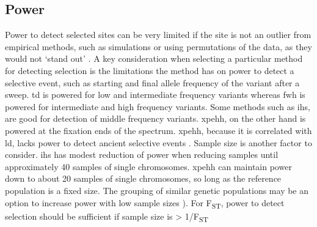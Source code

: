 \documentclass[]{report}
\begin{document}
\subsection{Power}\label{power}

Power to detect selected sites can be very limited if the site is not an
outlier from empirical methods, such as simulations or using
permutations of the data, as they would not `stand out'
\citep{Teshima2006}. A key consideration when selecting a particular
method for detecting selection is the limitations the method has on
power to detect a selective event, such as starting and final allele
frequency of the variant after a sweep. \Gls{td} is powered for low and
intermediate frequency variants \citep{Simonsen1995} whereas \gls{fwh}
is powered for intermediate and high frequency variants. Some methods
such as \gls{ihs}, are good for detection of middle frequency variants.
\Gls{xpehh}, on the other hand is powered at the fixation ends of the
spectrum. \Gls{xpehh}, because it is correlated with \gls{ld}, lacks
power to detect ancient selective events \citep{Chen2010}. Sample size
is another factor to consider. \Gls{ihs} has modest reduction of power
when reducing samples until approximately 40 samples of single
chromosomes. \Gls{xpehh} can maintain power down to about 20 samples of
single chromosomes, so long as the reference population is a fixed size.
The grouping of similar genetic populations may be an option to increase
power with low sample sizes \citep{pickrell2009signals}). For
F\textsubscript{ST}, power to detect selection should be sufficient if
sample size is \textgreater{} 1/F\textsubscript{ST}
\citep{Bhatia2011, Bhatia2013a}
\end{document}
